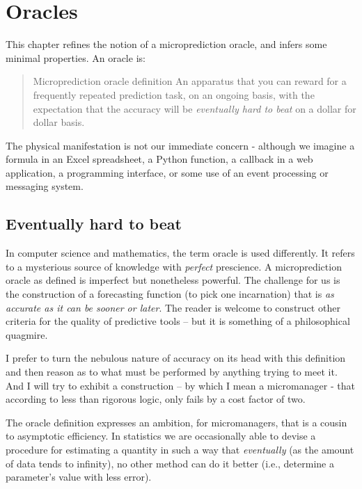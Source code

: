 
\chapter{Oracles}
\label{chapter:oracles}

\newcommand{\leaf}{leaf bot}

This chapter refines the notion of a microprediction oracle, and infers some minimal properties. An oracle is:

\begin{quote}{Microprediction oracle definition}
An apparatus that you can reward for a frequently repeated prediction task, on an ongoing basis, with the expectation that the accuracy will be {\em eventually hard to beat} on a dollar for dollar basis. 
\end{quote}
The physical manifestation is not our immediate concern - although we imagine a formula in an Excel spreadsheet, a Python function, a callback in a web application, a programming interface, or some use of an event processing or messaging system.  

 

\section{Eventually hard to beat}

In computer science and mathematics, the term oracle is used differently. It refers to a mysterious source of knowledge with {\em perfect} prescience. A microprediction oracle as defined is imperfect but nonetheless powerful. The challenge for us is the construction of a forecasting function (to pick one incarnation) that is {\em as accurate as it can be sooner or later}. The reader is welcome to construct other criteria for the quality of predictive tools -- but it is something of a philosophical quagmire. 

I prefer to turn the nebulous nature of accuracy on its head with this definition and then reason as to what must be performed by anything trying to meet it. And I will try to exhibit a construction -- by which I mean a micromanager - that according to less than rigorous logic, only fails by a cost factor of two. 


The oracle definition expresses an ambition, for micromanagers, that is a cousin to asymptotic efficiency. In statistics we are occasionally able to devise a procedure for estimating a quantity in such a way that {\em eventually} (as the amount of data tends to infinity), no other method can do it better (i.e., determine a parameter's value with less error). 


